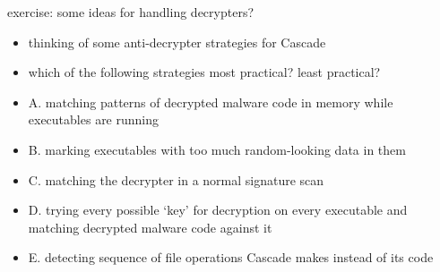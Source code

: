 \begin{frame}{exercise: some ideas for handling decrypters?}
    \begin{itemize}
    \item thinking of some anti-decrypter strategies for Cascade
    \item which of the following strategies most practical? least practical?
    \vspace{.5cm}
    \item A. matching patterns of decrypted malware code in memory while executables are running
    \item B. marking executables with too much random-looking data in them
    \item C. matching the decrypter in a normal signature scan
    \item D. trying every possible `key' for decryption on every executable and matching decrypted malware code against it
    \item E. detecting sequence of file operations Cascade makes instead of its code
    \end{itemize}
\end{frame}
